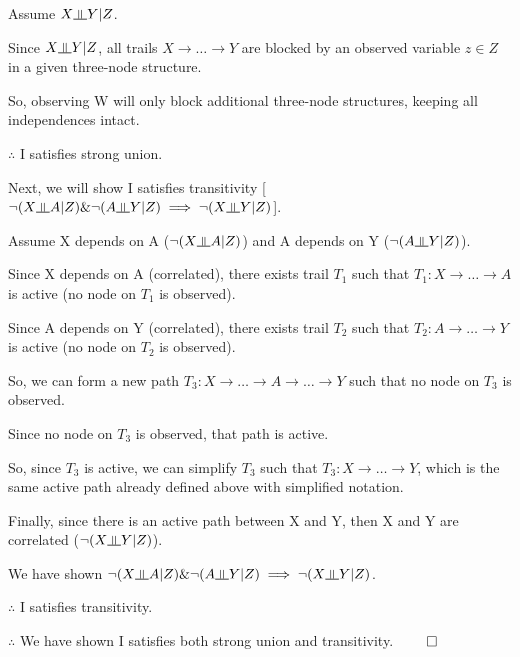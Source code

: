 \documentclass[12pt]{article}
\newcommand{\indep}{\rotatebox[origin=c]{90}{$\models$}}
\begin{document}
Assume $X \indep Y \vert Z$.

Since $X \indep Y \vert Z$, all trails $X \rightarrow \dots \rightarrow Y$ are blocked by an observed variable $z \in Z$ in a given three-node structure.

So, observing W will only block additional three-node structures, keeping all independences intact.

$\therefore$ I satisfies strong union.

Next, we will show I satisfies transitivity [$\neg(X \indep A \vert Z) \& \neg(A \indep Y \vert Z) \implies \neg(X \indep Y \vert Z)$].

Assume X depends on A ($\neg(X \indep A \vert Z)$) and A depends on Y ($\neg(A \indep Y \vert Z)$).

Since X depends on A (correlated), there exists trail $T_1$ such that $T_1 : X \rightarrow \dots \rightarrow A$ is active (no node on $T_1$ is observed).

Since A depends on Y (correlated), there exists trail $T_2$ such that $T_2 : A \rightarrow \dots \rightarrow Y$ is active (no node on $T_2$ is observed).

So, we can form a new path $T_3 : X \rightarrow \dots \rightarrow A \rightarrow \dots \rightarrow Y$ such that no node on $T_3$ is observed.

Since no node on $T_3$ is observed, that path is active.

So, since $T_3$ is active, we can simplify $T_3$ such that $T_3 : X \rightarrow \dots \rightarrow Y$, which is the same active path already defined above with simplified notation.

Finally, since there is an active path between X and Y, then X and Y are correlated ($\neg(X \indep Y \vert Z)$).

We have shown $\neg(X \indep A \vert Z) \& \neg(A \indep Y \vert Z) \implies \neg(X \indep Y \vert Z)$. 

$\therefore$ I satisfies transitivity.

$\therefore$ We have shown I satisfies both strong union and transitivity. $\qed$
\end{document}
